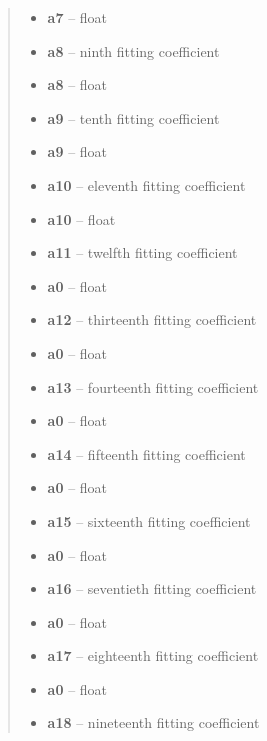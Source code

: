 \documentclass[a4paper,12pt,english]{sphinxmanual}
\begin{document}
\begin{fulllineitems}
\begin{quote}
\begin{description}
\begin{itemize}
\item {} 
\textbf{a7} -- float

\item {} 
\textbf{a8} -- ninth fitting coefficient

\item {} 
\textbf{a8} -- float

\item {} 
\textbf{a9} -- tenth fitting coefficient

\item {} 
\textbf{a9} -- float

\item {} 
\textbf{a10} -- eleventh fitting coefficient

\item {} 
\textbf{a10} -- float

\item {} 
\textbf{a11} -- twelfth fitting coefficient

\item {} 
\textbf{a0} -- float

\item {} 
\textbf{a12} -- thirteenth fitting coefficient

\item {} 
\textbf{a0} -- float

\item {} 
\textbf{a13} -- fourteenth fitting coefficient

\item {} 
\textbf{a0} -- float

\item {} 
\textbf{a14} -- fifteenth fitting coefficient

\item {} 
\textbf{a0} -- float

\item {} 
\textbf{a15} -- sixteenth fitting coefficient

\item {} 
\textbf{a0} -- float

\item {} 
\textbf{a16} -- seventieth fitting coefficient

\item {} 
\textbf{a0} -- float

\item {} 
\textbf{a17} -- eighteenth fitting coefficient

\item {} 
\textbf{a0} -- float

\item {} 
\textbf{a18} -- nineteenth fitting coefficient


\end{itemize}
\end{description}
\end{quote}
\end{fulllineitems}
\end{document}
